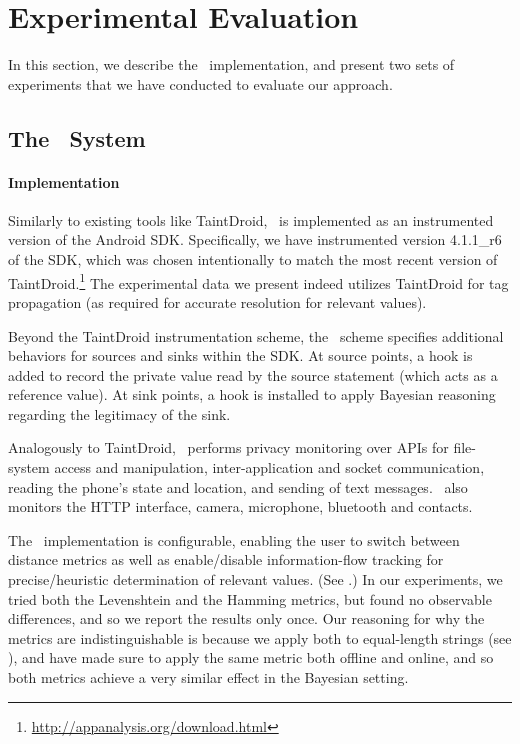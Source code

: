 \section{Experimental Evaluation}\label{Se:experiments}

In this section, we describe the \Tool\ implementation, and present two sets of experiments that we have conducted to evaluate our approach.

\subsection{The \Tool\ System}\label{Se:impl}

\paragraph{Implementation} Similarly to existing tools like TaintDroid, \Tool\ is implemented as an instrumented version of the Android SDK. Specifically, we have instrumented version 4.1.1\_r6 of the SDK, which was chosen intentionally to match the most recent version of TaintDroid.\footnote{
	\href{http://appanalysis.org/download.html}{http://appanalysis.org/download.html}
} The experimental data we present indeed utilizes TaintDroid for tag propagation (as required for accurate resolution for relevant values).

Beyond the TaintDroid instrumentation scheme, the \Tool\ scheme specifies additional behaviors for sources and sinks within the SDK. At source points, a hook is added to record the private value read by the source statement (which acts as a reference value). At sink points, a hook is installed to apply Bayesian reasoning regarding the legitimacy of the sink.

Analogously to TaintDroid, \Tool\ performs privacy monitoring over APIs for file-system access and manipulation, inter-application and socket communication, reading the phone's state and location, and sending of text messages. \Tool\ also monitors the HTTP interface, camera, microphone, bluetooth and contacts. 

The \Tool\ implementation is configurable, enabling the user to switch between distance metrics as well as enable/disable information-flow tracking for precise/heuristic determination of relevant values. (See .) In our experiments, we tried both the Levenshtein and the Hamming metrics, but found no observable differences, and so we report the results only once. Our reasoning for why the metrics are indistinguishable is because we apply both to equal-length strings (see ), and have made sure to apply the same metric both offline and online, and so both metrics achieve a very similar effect in the Bayesian setting.

